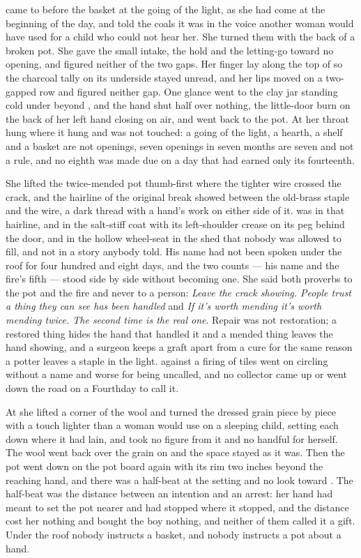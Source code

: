  came to  before the basket at the going of the light, as she had come at the beginning of the day, and told the coals it was  in the voice another woman would have used for a child who could not hear her. She turned them with the back of a broken pot. She gave the small intake, the hold and the letting-go toward no opening, and figured neither of the two gaps. Her finger lay along the top of  so the charcoal tally on its underside stayed unread, and her lips moved on a two-gapped row and figured neither gap. One glance went to the clay jar standing cold under  beyond , and the hand shut half over nothing, the little-door burn on the back of her left hand closing on air, and went back to the pot. At her throat  hung where it hung and was not touched: a going of the light, a hearth, a shelf and a basket are not openings, seven openings in seven months are seven and not a rule, and no eighth was made due on a day that had earned only its fourteenth.

She lifted the twice-mended pot thumb-first where the tighter wire crossed the crack, and the hairline of the original break showed between the old-brass staple and the wire, a dark thread with a hand's work on either side of it.  was in that hairline, and in the salt-stiff coat with its left-shoulder crease on its peg behind the door, and in the hollow wheel-seat in the shed that nobody was allowed to fill, and not in a story anybody told. His name had not been spoken under the roof for four hundred and eight days, and the two counts --- his name and the fire's fifth --- stood side by side without becoming one. She said both proverbs to the pot and the fire and never to a person: \emph{Leave the crack showing. People trust a thing they can see has been handled} and \emph{If it's worth mending it's worth mending twice. The second time is the real one}. Repair was not restoration; a restored thing hides the hand that handled it and a mended thing leaves the hand showing, and a surgeon keeps a graft apart from a cure for the same reason a potter leaves a staple in the light.  against a firing of tiles went on circling without a name and worse for being uncalled, and no collector came up or went down the road on a Fourthday to call it.

At  she lifted a corner of the wool and turned the dressed grain piece by piece with a touch lighter than a woman would use on a sleeping child, setting each down where it had lain, and took no figure from it and no handful for herself. The wool went back over the grain on  and the space stayed as it was. Then the pot went down on the pot board again with its rim two inches beyond the reaching hand, and there was a half-beat at the setting and no look toward . The half-beat was the distance between an intention and an arrest: her hand had meant to set the pot nearer and had stopped where it stopped, and the distance cost her nothing and bought the boy nothing, and neither of them called it a gift. Under the roof nobody instructs a basket, and nobody instructs a pot about a hand.

